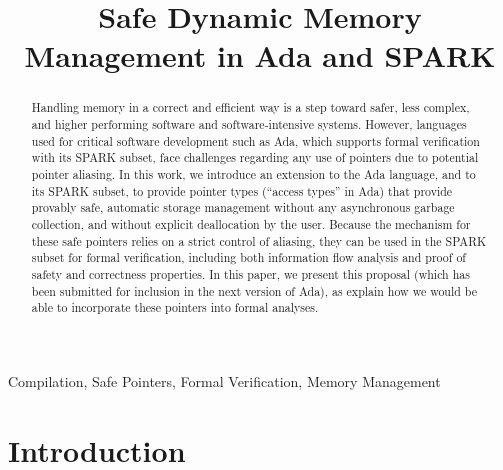 \documentclass{llncs}
\begin{document}

\title{Safe Dynamic Memory Management in Ada and SPARK}

\maketitle
\begin{abstract}
Handling memory in a correct and efficient way is a step toward safer, less complex, and higher performing software and software-intensive systems. However, languages used for critical software development such as Ada, which supports formal verification with its SPARK subset, face challenges regarding any use of pointers due to potential pointer aliasing. In this work, we introduce an extension to the Ada language, and to its SPARK subset, to provide pointer types (``access types'' in Ada) that provide provably safe, automatic storage management without any asynchronous garbage collection, and without explicit deallocation by the user. Because the mechanism for these safe pointers relies on a strict control of aliasing, they can be used in the SPARK subset for formal verification, including both information flow analysis and proof of safety and correctness properties. In this paper, we present this proposal (which has been submitted for inclusion in the next version of Ada), as explain
how we would be able to incorporate these pointers into formal analyses.
\end{abstract}



\keywords

Compilation, Safe Pointers, Formal Verification, Memory Management


\section{Introduction}
\end{document}
